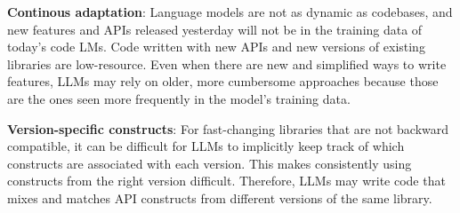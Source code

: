 

\textbf{Continous adaptation}: Language models are not as dynamic as codebases, and new features and APIs released yesterday will not be in the training data of today's code LMs. Code written with new APIs and new versions of existing libraries are low-resource. Even when there are new and simplified ways to write features, LLMs may rely on older, more cumbersome approaches because those are the ones seen more frequently in the model's training data. 

\textbf{Version-specific constructs}:
For fast-changing libraries that are not backward compatible, it can be difficult for LLMs to implicitly keep track of which constructs are associated with each version. This makes consistently using constructs from the right version difficult. Therefore, LLMs may write code that mixes and matches API constructs from different versions of the same library. 



